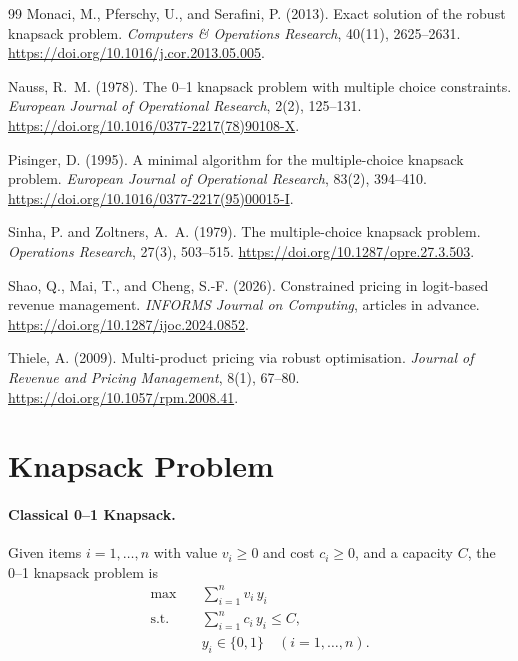 \documentclass[11pt, a4paper]{article}
\newif\ifblind
\theoremstyle{plain}
\theoremstyle{definition}
\theoremstyle{remark}
\begin{document}
\begin{thebibliography}{99}
Monaci, M., Pferschy, U., and Serafini, P. (2013).
\newblock Exact solution of the robust knapsack problem.
\newblock \emph{Computers \& Operations Research}, 40(11), 2625--2631.
\newblock \url{https://doi.org/10.1016/j.cor.2013.05.005}.

Nauss, R.~M. (1978).
\newblock The 0--1 knapsack problem with multiple choice constraints.
\newblock \emph{European Journal of Operational Research}, 2(2), 125--131.
\newblock \url{https://doi.org/10.1016/0377-2217(78)90108-X}.

Pisinger, D. (1995).
\newblock A minimal algorithm for the multiple-choice knapsack problem.
\newblock \emph{European Journal of Operational Research}, 83(2), 394--410.
\newblock \url{https://doi.org/10.1016/0377-2217(95)00015-I}.

Sinha, P. and Zoltners, A.~A. (1979).
\newblock The multiple-choice knapsack problem.
\newblock \emph{Operations Research}, 27(3), 503--515.
\newblock \url{https://doi.org/10.1287/opre.27.3.503}.

\ifblind\else
{}
Shao, Q., Mai, T., and Cheng, S.-F. (2026).
\newblock Constrained pricing in logit-based revenue management.
\newblock \emph{INFORMS Journal on Computing}, articles in advance.
\newblock \url{https://doi.org/10.1287/ijoc.2024.0852}.
\fi

Thiele, A. (2009).
\newblock Multi-product pricing via robust optimisation.
\newblock \emph{Journal of Revenue and Pricing Management}, 8(1), 67--80.
\newblock \url{https://doi.org/10.1057/rpm.2008.41}.

\end{thebibliography}

\appendix
\section{Knapsack Problem}\label{app:background}

\paragraph{Classical 0--1 Knapsack.}
Given items $i=1,\dots,n$ with value $v_i\ge 0$ and cost $c_i\ge 0$, and a capacity $C$, the 0--1 knapsack problem is
\begin{align}
\max \quad & \sum_{i=1}^n v_i\,y_i \\
\text{s.t.}\quad & \sum_{i=1}^n c_i\,y_i \le C, \\
& y_i \in\{0,1\}\quad (i=1,\dots,n).
\end{align}
\end{document}
